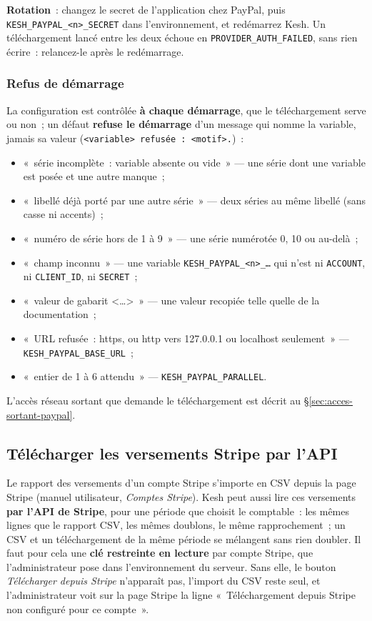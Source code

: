 \documentclass[a4paper,11pt,oneside]{article}
\begin{document}
\textbf{Rotation}~: changez le secret de l'application chez PayPal, puis \texttt{KESH\_PAYPAL\_<n>\_SECRET} dans l'environnement, et redémarrez Kesh. Un téléchargement lancé entre les deux échoue en \texttt{PROVIDER\_AUTH\_FAILED}, sans rien écrire~: relancez-le après le redémarrage.

\subsubsection{Refus de démarrage}

La configuration est contrôlée \textbf{à chaque démarrage}, que le téléchargement serve ou non~; un défaut \textbf{refuse le démarrage} d'un message qui nomme la variable, jamais sa valeur (\texttt{<variable> refusée~: <motif>.})~:
\begin{itemize}
    \item «~série incomplète~: variable absente ou vide~» --- une série dont une variable est posée et une autre manque~;
    \item «~libellé déjà porté par une autre série~» --- deux séries au même libellé (sans casse ni accents)~;
    \item «~numéro de série hors de 1 à 9~» --- une série numérotée 0, 10 ou au-delà~;
    \item «~champ inconnu~» --- une variable \texttt{KESH\_PAYPAL\_<n>\_…} qui n'est ni \texttt{ACCOUNT}, ni \texttt{CLIENT\_ID}, ni \texttt{SECRET}~;
    \item «~valeur de gabarit <…>~» --- une valeur recopiée telle quelle de la documentation~;
    \item «~URL refusée~: https, ou http vers 127.0.0.1 ou localhost seulement~» --- \texttt{KESH\_PAYPAL\_BASE\_URL}~;
    \item «~entier de 1 à 6 attendu~» --- \texttt{KESH\_PAYPAL\_PARALLEL}.
\end{itemize}

L'accès réseau sortant que demande le téléchargement est décrit au \S\ref{sec:acces-sortant-paypal}.

\subsection{Télécharger les versements Stripe par l'API}\label{sec:stripe-api}

Le rapport des versements d'un compte Stripe s'importe en CSV depuis la page Stripe (manuel utilisateur, \emph{Comptes Stripe}). Kesh peut aussi lire ces versements \textbf{par l'API de Stripe}, pour une période que choisit le comptable~: les mêmes lignes que le rapport CSV, les mêmes doublons, le même rapprochement~; un CSV et un téléchargement de la même période se mélangent sans rien doubler. Il faut pour cela une \textbf{clé restreinte en lecture} par compte Stripe, que l'administrateur pose dans l'environnement du serveur. Sans elle, le bouton \emph{Télécharger depuis Stripe} n'apparaît pas, l'import du CSV reste seul, et l'administrateur voit sur la page Stripe la ligne «~Téléchargement depuis Stripe non configuré pour ce compte~».
\end{document}
